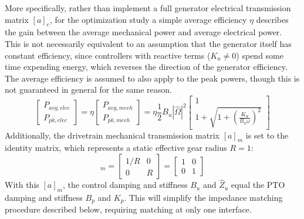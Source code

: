 More specifically, rather than implement a full generator electrical transmission matrix $[a]_e$, for the optimization study a simple average efficiency $\eta$ describes the gain between the average mechanical power and average electrical power.
This is not necessarily equivalent to an assumption that the generator itself has constant efficiency, since controllers with reactive terms ($K_u\neq 0$) spend some time expending energy, which reverses the direction of the generator efficiency.
The average efficiency is assumed to also apply to the peak powers, though this is not guaranteed in general for the same reason.
\begin{equation}
\begin{bmatrix}
P_{avg,elec} \\
P_{pk,elec}
\end{bmatrix}
= 
\eta
\begin{bmatrix}
P_{avg,mech} \\
P_{pk,mech}
\end{bmatrix}
= 
\eta \frac{1}{2} B_u |\hat{\Omega}|^2
\begin{bmatrix}
1 \\
 1 + \sqrt{1 + \left(\frac{K_u}{B_u \omega }\right) ^2  }
\end{bmatrix}
\end{equation}
Additionally, the drivetrain mechanical transmission matrix $[a]_m$ is set to the identity matrix, which represents a static effective gear radius $R=1$:
\begin{equation}
[a]_m = \begin{bmatrix}
1/R & 0 \\
0 & R
\end{bmatrix} = \begin{bmatrix}
1 & 0 \\
0 & 1
\end{bmatrix}
\end{equation}
With this $[a]_m$, the control damping and stiffness $B_u$ and $\hat{Z}_u$ equal the PTO damping and stiffness $B_p$ and $K_p$.
This will simplify the impedance matching procedure described below, requiring matching at only one interface.


